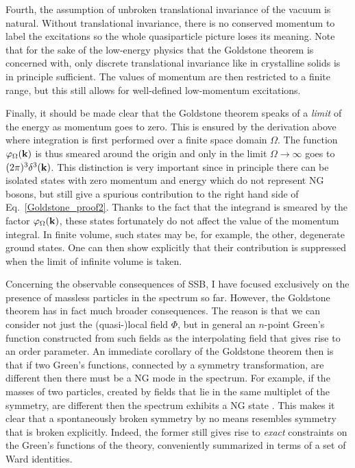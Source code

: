 \documentclass[final,3p,times,12pt,a4paper,sort&compress]{elsarticle}
\newcommand\vek[1]{{\boldsymbol{\bf #1}}}   %
\newcommand\vp{\varphi}
\begin{document}
Fourth, the assumption of unbroken translational invariance of the vacuum is
natural. Without translational invariance, there is no conserved momentum to
label the excitations so the whole quasiparticle picture loses its meaning. Note
that for the sake of the low-energy physics that the Goldstone theorem is
concerned with, only discrete translational invariance like in crystalline
solids is in principle sufficient. The values of momentum are then restricted to
a finite range, but this still allows for well-defined low-momentum excitations.

Finally, it should be made clear that the Goldstone theorem speaks of a
\emph{limit} of the energy as momentum goes to zero. This is ensured by the
derivation above where integration is first performed over a finite space
domain $\Omega$. The function $\vp_\Omega(\vek k)$ is thus smeared around the
origin and only in the limit $\Omega\to\infty$ goes to $(2\pi)^3\delta^3(\vek
k)$. This distinction is very important since in principle there can be
isolated states with zero momentum and energy which do not represent NG bosons,
but still give a spurious contribution to the right hand side of
Eq.~\eqref{Goldstone_proof2}. Thanks to the fact that the integrand is smeared
by the factor $\vp_\Omega(\vek k)$, these states fortunately do not affect the
value of the momentum integral. In finite volume, such states may be, for
example, the other, degenerate ground states. One can then show explicitly
\cite{Lange:1966zz} that their contribution is suppressed when the limit of
infinite volume is taken.

Concerning the observable consequences of SSB, I have focused exclusively on
the presence of massless particles in the spectrum so far. However, the
Goldstone theorem has in fact much broader consequences. The reason is that we
can consider not just the (quasi-)local field $\Phi$, but in general an
$n$-point Green's function constructed from such fields as the interpolating
field that gives rise to an order parameter. An immediate corollary of the
Goldstone theorem then is that if two Green's functions, connected by a
symmetry transformation, are different then there must be a NG mode in the
spectrum. For example, if the masses of two particles, created by fields that
lie in the same multiplet of the symmetry, are different then the spectrum
exhibits a NG state \cite{Frishman:1966fk}. This makes it clear that a
spontaneously broken symmetry by no means resembles symmetry that is broken
explicitly. Indeed, the former still gives rise to \emph{exact} constraints on
the Green's functions of the theory, conveniently summarized in terms of a set
of Ward identities.
\end{document}
